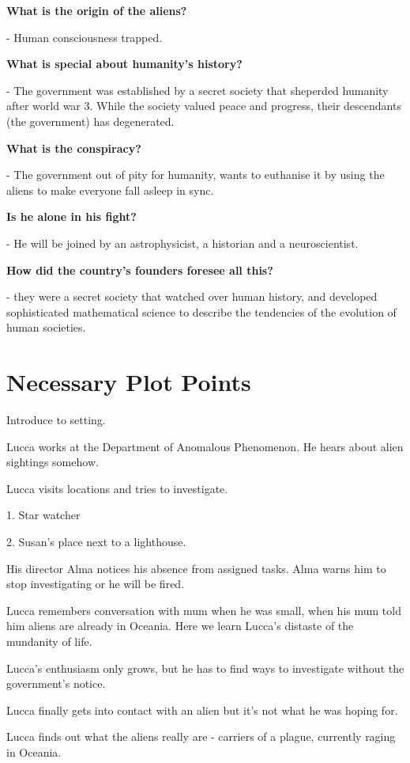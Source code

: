 \documentclass[11pt]{article}
\begin{document}
\textbf{What is the origin of the aliens?}

- Human consciousness trapped.


\textbf{What is special about humanity's history?}

- The government was established by a secret society that sheperded humanity after world war 3. While the society valued peace and progress, their descendants (the government) has degenerated. 


\textbf{What is the conspiracy?}

- The government out of pity for humanity, wants to euthanise it by using the aliens to make everyone fall asleep in sync.


\textbf{Is he alone in his fight?}

- He will be joined by an astrophysicist, a historian and a neuroscientist.


\textbf{How did the country's founders foresee all this?}

- they were a secret society that watched over human history, and developed sophisticated mathematical science to describe the tendencies of the evolution of human societies.


\section{Necessary Plot Points}
Introduce to setting.

Lucca works at the Department of Anomalous Phenomenon. He hears about alien sightings somehow.

Lucca visits locations and tries to investigate. 

1. Star watcher

2. Susan's place next to a lighthouse.

His director Alma notices his absence from assigned tasks. Alma warns him to stop investigating or he will be fired. 

Lucca remembers conversation with mum when he was small, when his mum told him aliens are already in Oceania. Here we learn Lucca's distaste of the mundanity of life.

Lucca's enthusiasm only grows, but he has to find ways to investigate without the government's notice.



Lucca finally gets into contact with an alien but it's not what he was hoping for.



Lucca finds out what the aliens really are - carriers of a plague, currently raging in Oceania.
\end{document}
